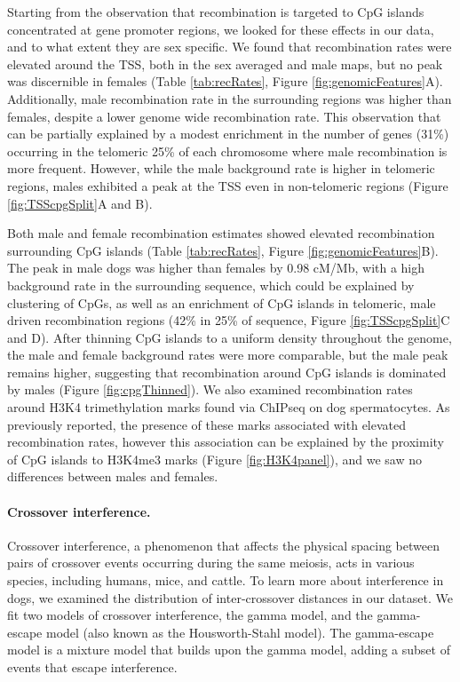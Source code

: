 Starting from the observation that recombination is targeted to CpG islands concentrated at gene promoter regions\cite{Auton2013}, we looked for these effects in our data, and to what extent they are sex specific.
We found that recombination rates were elevated around the TSS, both in the sex averaged and male maps, but no peak was discernible in females (Table \ref{tab:recRates}, Figure \ref{fig:genomicFeatures}A).
Additionally, male recombination rate in the surrounding regions was higher than females, despite a lower genome wide recombination rate.
This observation that can be partially explained by a modest enrichment in the number of genes (31\%) occurring in the telomeric 25\% of each chromosome where male recombination is more frequent.
However, while the male background rate is higher in telomeric regions, males exhibited a peak at the TSS even in non-telomeric regions (Figure \ref{fig:TSScpgSplit}A and B).

Both male and female recombination estimates showed elevated recombination surrounding CpG islands (Table \ref{tab:recRates}, Figure \ref{fig:genomicFeatures}B).
The peak in male dogs was higher than females by 0.98 cM/Mb, with a high background rate in the surrounding sequence, which could be explained by
clustering of CpGs, as well as an enrichment of CpG islands in telomeric, male driven recombination regions (42\% in 25\% of sequence, Figure \ref{fig:TSScpgSplit}C and D).
After thinning CpG islands to a uniform density throughout the genome, the male and female background rates were more comparable, but the male peak remains higher, suggesting that recombination around CpG islands is dominated by males (Figure \ref{fig:cpgThinned}).
We also examined recombination rates around H3K4 trimethylation marks found via ChIPseq on dog spermatocytes\cite{Auton2013}.
As previously reported, the presence of these marks associated with elevated recombination rates, however this association can be explained by the proximity of CpG islands to H3K4me3 marks (Figure \ref{fig:H3K4panel}), and we saw no differences between males and females.


\paragraph{Crossover interference.}
Crossover interference, a phenomenon that affects the physical spacing between pairs of crossover events occurring during the same meiosis, acts in various species, including humans\cite{Campbell2015,Broman2000,Housworth2003}, mice\cite{Broman2002}, and cattle\cite{Sandor2012}.
To learn more about interference in dogs, we examined the distribution of inter-crossover distances in our dataset.
We fit two models of crossover interference, the gamma model\cite{Broman2000}, and the gamma-escape model\cite{Housworth2003} (also known as the Housworth-Stahl model).
The gamma-escape model is a mixture model that builds upon the gamma model, adding a subset of events that escape interference.

